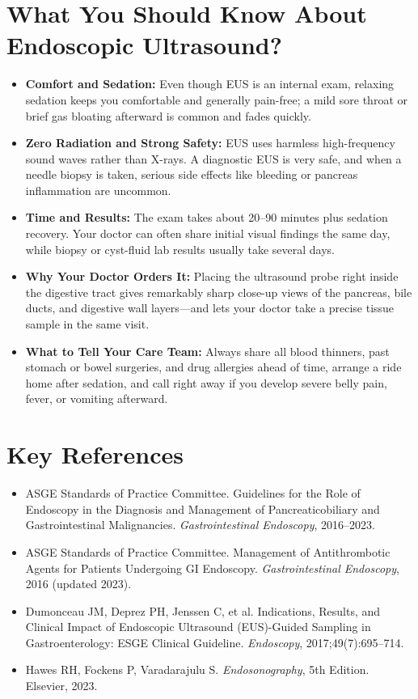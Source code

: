 \section{What You Should Know About Endoscopic Ultrasound?}

\begin{itemize}
    \item \textbf{Comfort and Sedation:} Even though EUS is an internal exam, relaxing sedation keeps you comfortable and generally pain-free; a mild sore throat or brief gas bloating afterward is common and fades quickly.
    \item \textbf{Zero Radiation and Strong Safety:} EUS uses harmless high-frequency sound waves rather than X-rays. A diagnostic EUS is very safe, and when a needle biopsy is taken, serious side effects like bleeding or pancreas inflammation are uncommon.
    \item \textbf{Time and Results:} The exam takes about 20--90 minutes plus sedation recovery. Your doctor can often share initial visual findings the same day, while biopsy or cyst-fluid lab results usually take several days.
    \item \textbf{Why Your Doctor Orders It:} Placing the ultrasound probe right inside the digestive tract gives remarkably sharp close-up views of the pancreas, bile ducts, and digestive wall layers---and lets your doctor take a precise tissue sample in the same visit.
    \item \textbf{What to Tell Your Care Team:} Always share all blood thinners, past stomach or bowel surgeries, and drug allergies ahead of time, arrange a ride home after sedation, and call right away if you develop severe belly pain, fever, or vomiting afterward.
\end{itemize}

\section{Key References}

\begin{itemize}
    \item ASGE Standards of Practice Committee. Guidelines for the Role of Endoscopy in the Diagnosis and Management of Pancreaticobiliary and Gastrointestinal Malignancies. \textit{Gastrointestinal Endoscopy}, 2016--2023.
    \item ASGE Standards of Practice Committee. Management of Antithrombotic Agents for Patients Undergoing GI Endoscopy. \textit{Gastrointestinal Endoscopy}, 2016 (updated 2023).
    \item Dumonceau JM, Deprez PH, Jenssen C, et al. Indications, Results, and Clinical Impact of Endoscopic Ultrasound (EUS)-Guided Sampling in Gastroenterology: ESGE Clinical Guideline. \textit{Endoscopy}, 2017;49(7):695--714.
    \item Hawes RH, Fockens P, Varadarajulu S. \textit{Endosonography}, 5th Edition. Elsevier, 2023.
\end{itemize}
